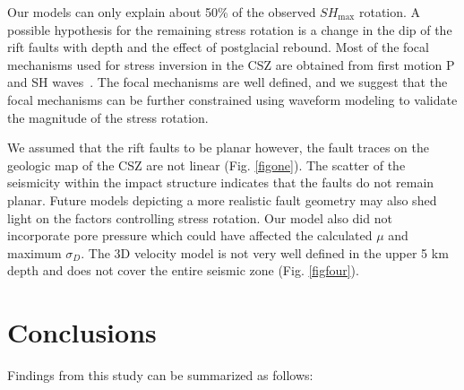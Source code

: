 \documentclass[draft]{agujournal2018}
\begin{document}
Our models can only explain about 50\% of the observed $SH_{\max}$ rotation. A possible hypothesis for the remaining stress rotation is a change in the dip of the rift faults with depth and the effect of postglacial rebound. Most of the focal mechanisms used for stress inversion in the CSZ are obtained from first motion P and SH waves~\citep{Mazzotti_2010,lamontagne1998}. The focal mechanisms are well defined, and we suggest that the focal mechanisms can be further constrained using waveform modeling to validate the magnitude of the stress rotation.

We assumed that the rift faults to be planar however, the fault traces on the geologic map of the CSZ are not linear (Fig. \ref{figone}). The scatter of the seismicity within the impact structure indicates that the faults do not remain planar. Future models depicting a more realistic fault geometry may also shed light on the factors controlling stress rotation. Our model also did not incorporate pore pressure which could have affected the calculated $\mu$ and maximum $\sigma_{D}$. The 3D velocity model is not very well defined in the upper 5 km depth and does not cover the entire seismic zone (Fig. \ref{figfour}).

\section{Conclusions}
Findings from this study can be summarized as follows:
\end{document}
